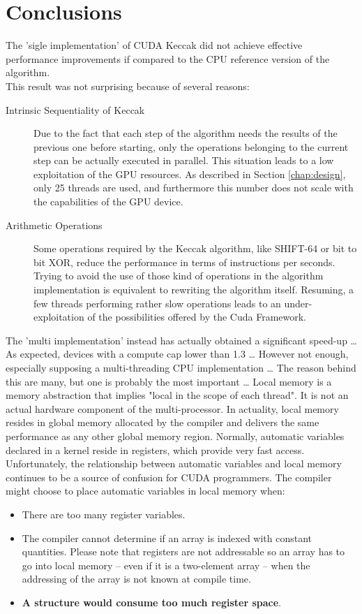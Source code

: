 \chapter{Conclusions} \label{chap:conclusions}
The 'sigle implementation' of CUDA Keccak did not achieve effective performance improvements if compared to the CPU reference version of the algorithm.\\
This result was not surprising because of several reasons:
\begin{description}
\item [Intrinsic Sequentiality of Keccak] Due to the fact that each step of the algorithm needs the results of the previous one before starting, only the operations belonging to the current step can be actually executed in parallel. This situation leads to a low exploitation of the GPU resources. As described in Section \ref{chap:design}, only 25 threads are used, and furthermore this number does not scale with the capabilities of the GPU device.
\item [Arithmetic Operations] Some operations required by the Keccak algorithm, like SHIFT-64 or bit to bit XOR, reduce the performance in terms of instructions per seconds. Trying to avoid the use of those kind of operations in the algorithm implementation is equivalent to rewriting the algorithm itself. Resuming, a few threads performing rather slow operations leads to an under-exploitation of the possibilities offered by the Cuda Framework.
\end{description}
The 'multi implementation' instead has actually obtained a significant speed-up \dots
As expected, devices with a compute cap lower than 1.3 \dots
However not enough, especially supposing a multi-threading CPU implementation \dots
The reason behind this are many, but one is probably the most important \dots
Local memory is a memory abstraction that implies "local in the scope of each thread". It is not an actual hardware component of the multi-processor. In actuality, local memory resides in global memory allocated by the compiler and delivers the same performance as any other global memory region. Normally, automatic variables declared in a kernel reside in registers, which provide very fast access. Unfortunately, the relationship between automatic variables and local memory continues to be a source of confusion for CUDA programmers. The compiler might choose to place automatic variables in local memory when:
\begin{itemize}
\item There are too many register variables.
\item The compiler cannot determine if an array is indexed with constant quantities. Please note that registers are not addressable so an array has to go into local memory -- even if it is a two-element array -- when the addressing of the array is not known at compile time.
\item \textbf{A structure would consume too much register space}.
\end{itemize}
